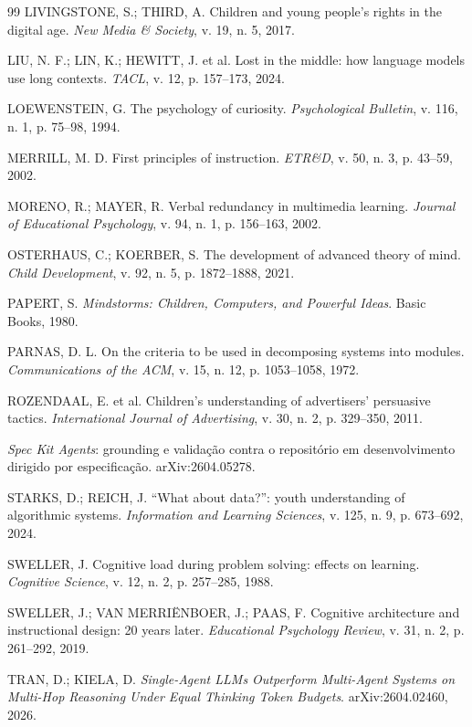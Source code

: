 \documentclass[11pt,a4paper]{article}
\begin{document}
\begin{thebibliography}{99}
LIVINGSTONE, S.; THIRD, A. Children and young people's rights in the digital age. \textit{New Media \& Society}, v. 19, n. 5, 2017.

LIU, N. F.; LIN, K.; HEWITT, J. et al. Lost in the middle: how language models use long contexts. \textit{TACL}, v. 12, p. 157--173, 2024.

LOEWENSTEIN, G. The psychology of curiosity. \textit{Psychological Bulletin}, v. 116, n. 1, p. 75--98, 1994.

MERRILL, M. D. First principles of instruction. \textit{ETR\&D}, v. 50, n. 3, p. 43--59, 2002.

MORENO, R.; MAYER, R. Verbal redundancy in multimedia learning. \textit{Journal of Educational Psychology}, v. 94, n. 1, p. 156--163, 2002.

OSTERHAUS, C.; KOERBER, S. The development of advanced theory of mind. \textit{Child Development}, v. 92, n. 5, p. 1872--1888, 2021.

PAPERT, S. \textit{Mindstorms: Children, Computers, and Powerful Ideas}. Basic Books, 1980.

PARNAS, D. L. On the criteria to be used in decomposing systems into modules. \textit{Communications of the ACM}, v. 15, n. 12, p. 1053--1058, 1972.

ROZENDAAL, E. et al. Children's understanding of advertisers' persuasive tactics. \textit{International Journal of Advertising}, v. 30, n. 2, p. 329--350, 2011.

\textit{Spec Kit Agents}: grounding e validação contra o repositório em desenvolvimento dirigido por especificação. arXiv:2604.05278.

STARKS, D.; REICH, J. ``What about data?'': youth understanding of algorithmic systems. \textit{Information and Learning Sciences}, v. 125, n. 9, p. 673--692, 2024.

SWELLER, J. Cognitive load during problem solving: effects on learning. \textit{Cognitive Science}, v. 12, n. 2, p. 257--285, 1988.

SWELLER, J.; VAN MERRIËNBOER, J.; PAAS, F. Cognitive architecture and instructional design: 20 years later. \textit{Educational Psychology Review}, v. 31, n. 2, p. 261--292, 2019.

TRAN, D.; KIELA, D. \textit{Single-Agent LLMs Outperform Multi-Agent Systems on Multi-Hop Reasoning Under Equal Thinking Token Budgets}. arXiv:2604.02460, 2026.


\end{thebibliography}
\end{document}
